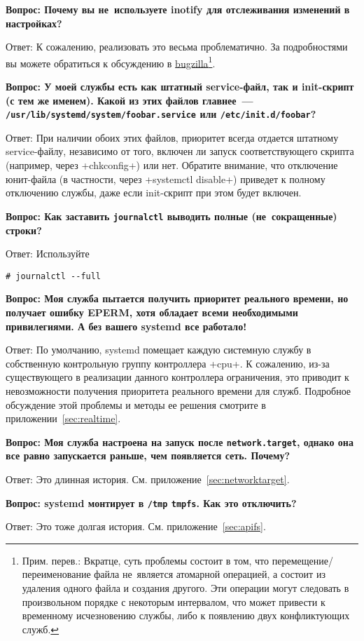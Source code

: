 \documentclass[10pt,oneside,a4paper]{article}
\newcommand{\qna}[1]{\medskip\par\textbf{Вопрос: #1}\nopagebreak\par Ответ:}
\begin{document}
\qna{Почему вы не~используете inotify для отслеживания изменений в настройках?}
К сожалению, реализовать это весьма проблематично. За подробностями вы можете
обратиться к обсуждению в
\href{https://bugzilla.redhat.com/show_bug.cgi?id=615527}{bugzilla}\footnote{Прим.
перев.: Вкратце, суть проблемы состоит в том, что перемещение/переименование
файла не~является атомарной операцией, а состоит из удаления одного файла и
создания другого. Эти операции могут следовать в произвольном порядке с
некоторым интервалом, что может привести к временному исчезновению службы, либо
к появлению двух конфликтующих служб.}.

\qna{У моей службы есть как штатный service-файл, так и init-скрипт (с тем же
именем). Какой из этих файлов главнее~---
\texttt{/usr/lib/systemd/system/foobar.service} или 
\texttt{/etc/init.d/foobar}?}
При наличии обоих этих файлов, приоритет всегда отдается штатному service-файлу,
независимо от того, включен ли запуск соответствующего скрипта (например, через
+chkconfig+) или нет. Обратите внимание, что отключение юнит-файла (в частности,
через +systemctl disable+) приведет к полному отключению службы, даже если
init-скрипт при этом будет включен.

\qna{Как заставить \texttt{journalctl} выводить полные (не~сокращенные) строки?}
Используйте
\begin{Verbatim}
# journalctl --full
\end{Verbatim}

\qna{Моя служба пытается получить приоритет реального времени, но получает
ошибку EPERM, хотя обладает всеми необходимыми привилегиями. А без вашего
systemd все работало!}
По умолчанию, systemd помещает каждую системную службу в собственную контрольную
группу контроллера +cpu+. К сожалению, из-за существующего в реализации данного
контроллера ограничения, это приводит к невозможности получения приоритета
реального времени для служб. Подробное обсуждение этой проблемы и методы ее
решения смотрите в приложении~\ref{sec:realtime}.

\qna{Моя служба настроена на запуск после \texttt{network.target}, однако она
все равно запускается раньше, чем появляется сеть. Почему?}
Это длинная история. См. приложение~\ref{sec:networktarget}.

\qna{systemd монтирует в \texttt{/tmp} \texttt{tmpfs}. Как это отключить?}
Это тоже долгая история. См. приложение~\ref{sec:apifs}.
\end{document}
